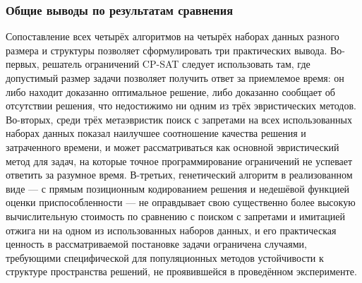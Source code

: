 \subsubsection { Общие выводы по результатам сравнения}

Сопоставление всех четырёх алгоритмов на четырёх наборах данных разного размера и структуры позволяет сформулировать три практических вывода. Во-первых, решатель ограничений CP-SAT следует использовать там, где допустимый размер задачи позволяет получить ответ за приемлемое время: он либо находит доказанно оптимальное решение, либо доказанно сообщает об отсутствии решения, что недостижимо ни одним из трёх эвристических методов. Во-вторых, среди трёх метаэвристик поиск с запретами на всех использованных наборах данных показал наилучшее соотношение качества решения и затраченного времени, и может рассматриваться как основной эвристический метод для задач, на которые точное программирование ограничений не успевает ответить за разумное время. В-третьих, генетический алгоритм в реализованном виде — с прямым позиционным кодированием решения и недешёвой функцией оценки приспособленности — не оправдывает свою существенно более высокую вычислительную стоимость по сравнению с поиском с запретами и имитацией отжига ни на одном из использованных наборов данных, и его практическая ценность в рассматриваемой постановке задачи ограничена случаями, требующими специфической для популяционных методов устойчивости к структуре пространства решений, не проявившейся в проведённом эксперименте.
